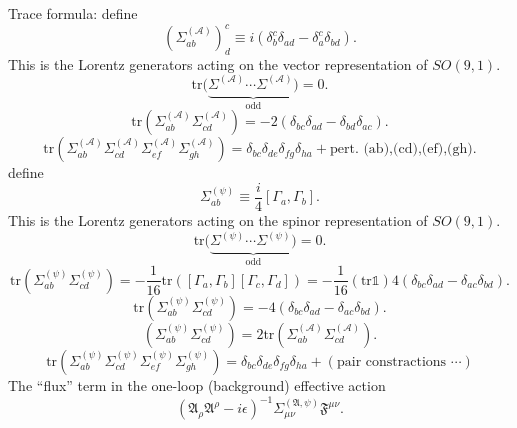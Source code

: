 
Trace formula:
define
\[
	(\Sigma^{(\mathcal{A})}_{ab})^c_d \equiv
	i (\delta^c_b \delta_{ad} - \delta^c_a \delta_{bd})
.\] 
This is the Lorentz generators acting on the vector representation of
$SO(9,1)$.
\[
	\mathrm{tr} (
	\underbrace{
		\Sigma^{(\mathcal{A})}\cdots \Sigma^{(\mathcal{A})})
	}_{\text{odd}}
	=0
.\] 
\[
	\mathrm{tr}(\Sigma^{(\mathcal{A})}_{ab}\Sigma^{(\mathcal{A})}_{cd})
	= - 2 (\delta_{bc} \delta_{ad} - \delta_{bd} \delta_{ac})
.\] 
\[
	\mathrm{tr}(\Sigma^{(\mathcal{A})}_{ab}
	\Sigma^{(\mathcal{A})}_{cd}
	\Sigma^{(\mathcal{A})}_{ef}
	\Sigma^{(\mathcal{A})}_{gh})
	=  \delta_{bc}\delta_{de}\delta_{fg}\delta_{ha}
	+ \text{pert. (ab),(cd),(ef),(gh)}
.\] 
define
\[
	\Sigma_{ab}^{(\psi)} \equiv \frac{i}{4} [\Gamma_a,\Gamma_b]
.\] 
This is the Lorentz generators acting on the spinor representation of
$SO(9,1)$.
\[
	\mathrm{tr} (
	\underbrace{
		\Sigma^{(\psi)}\cdots \Sigma^{(\psi)})
	}_{\text{odd}}
	=0
.\] 
\[
\mathrm{tr} ( 
\Sigma_{ab}^{(\psi)} \Sigma_{cd}^{(\psi)}) 
= -\frac{1}{16} \mathrm{tr}
([\Gamma_a,\Gamma_b][\Gamma_c,\Gamma_d])
= - \frac{1}{16}(\mathrm{tr}\mathds{1})
4(\delta_{bc} \delta_{ad} - \delta_{ac} \delta_{bd})
.\] 
\[
\mathrm{tr} ( 
\Sigma_{ab}^{(\psi)} \Sigma_{cd}^{(\psi)}) 
= - 4
(\delta_{bc} \delta_{ad} - \delta_{ac} \delta_{bd})
.\] 
\[
	(\Sigma_{ab}^{(\psi)} \Sigma_{cd}^{(\psi)}) 
= 2\mathrm{tr}(\Sigma^{(\mathcal{A})}_{ab}\Sigma^{(\mathcal{A})}_{cd})
.\] 
\[
	\mathrm{tr}(\Sigma^{(\psi)}_{ab}
	\Sigma^{(\psi)}_{cd}
	\Sigma^{(\psi)}_{ef}
	\Sigma^{(\psi)}_{gh})
	= 
	\delta_{bc}\delta_{de}\delta_{fg}\delta_{ha}
	+ (\text{pair constractions } \cdots)
\] 
The ``flux'' term in the one-loop (background) effective action
\[
	(\mathfrak{A}_\rho \mathfrak{A}^\rho - i \epsilon)^{-1}
	\Sigma_{\mu\nu}^{(\mathfrak{A},\psi)} \mathfrak{F}^{\mu\nu}
.\] 

